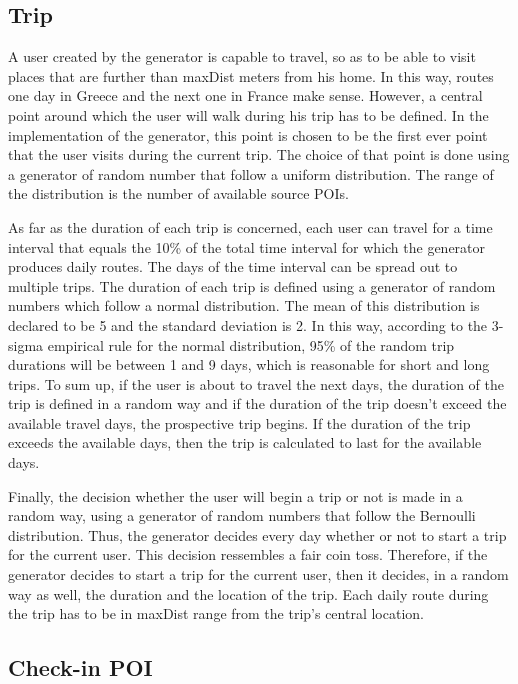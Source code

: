 \subsection{Trip}

A user created by the generator is capable to travel, so as to be able to visit places that are further than maxDist meters from his home. In this way, 
routes one day in Greece and the next one in France make sense. However, a central point around which the user will walk during his trip has to be defined. 
In the implementation of the generator, this point is chosen to be the first ever point that the user visits during the current trip. 
The choice of that point is done using a generator of random number that follow a uniform distribution. The range of the distribution is the number 
of available source POIs.

As far as the duration of each trip is concerned, each user can travel for a time interval that equals the 10\% of the total time interval for which the generator 
produces daily routes. The days of the time interval can be spread out to multiple trips. The duration of each trip is defined using a generator of random numbers 
which follow a normal distribution. The mean of this distribution is declared to be 5 and the standard deviation is 2. In this way, according to the 
3-sigma empirical rule for the normal distribution, 95\% of the random trip durations will be between 1 and 9 days, which is reasonable for short and long trips. 
To sum up, if the user is about to travel the next days, the duration of the trip is defined in a random way and if the duration of the trip doesn't exceed the 
available travel days, the prospective trip begins. If the duration of the trip exceeds the available days, then the trip is calculated to last for the 
available days.

Finally, the decision whether the user will begin a trip or not is made in a random way, using a generator of random numbers that follow the Bernoulli distribution. 
Thus, the generator decides every day whether or not to start a trip for the current user. This decision ressembles a fair coin toss. Therefore, 
if the generator decides to start a trip for the current user, then it decides, in a random way as well, the duration and the location of the trip. Each 
daily route during the trip has to be in maxDist range from the trip's central location.

\subsection{Check-in POI}

